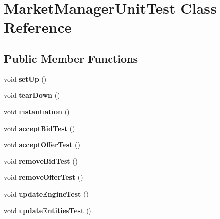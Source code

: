 \hypertarget{class_market_manager_unit_test}{\section{Market\+Manager\+Unit\+Test Class Reference}
\label{class_market_manager_unit_test}
}
\subsection*{Public Member Functions}
\begin{DoxyCompactItemize}
\item 
\hypertarget{class_market_manager_unit_test_a7675c43ec3a21669742870c5ff7bcdef}{void {\bfseries set\+Up} ()}\label{class_market_manager_unit_test_a7675c43ec3a21669742870c5ff7bcdef}

\item 
\hypertarget{class_market_manager_unit_test_a8ce1dfb5c96973d49b3b1308bc9b77b9}{void {\bfseries tear\+Down} ()}\label{class_market_manager_unit_test_a8ce1dfb5c96973d49b3b1308bc9b77b9}

\item 
\hypertarget{class_market_manager_unit_test_a975ffc40c27926b93d755a313440c35a}{void {\bfseries instantiation} ()}\label{class_market_manager_unit_test_a975ffc40c27926b93d755a313440c35a}

\item 
\hypertarget{class_market_manager_unit_test_aadbb351148ad8792ffdc73d21a477d46}{void {\bfseries accept\+Bid\+Test} ()}\label{class_market_manager_unit_test_aadbb351148ad8792ffdc73d21a477d46}

\item 
\hypertarget{class_market_manager_unit_test_a048bcd980b57e21cf535525c3d354327}{void {\bfseries accept\+Offer\+Test} ()}\label{class_market_manager_unit_test_a048bcd980b57e21cf535525c3d354327}

\item 
\hypertarget{class_market_manager_unit_test_ad15bca438fb420eb4edc10d2a6d5d69b}{void {\bfseries remove\+Bid\+Test} ()}\label{class_market_manager_unit_test_ad15bca438fb420eb4edc10d2a6d5d69b}

\item 
\hypertarget{class_market_manager_unit_test_a3a39f91093490fa570428eeadbee53d8}{void {\bfseries remove\+Offer\+Test} ()}\label{class_market_manager_unit_test_a3a39f91093490fa570428eeadbee53d8}

\item 
\hypertarget{class_market_manager_unit_test_a1c14446d8fae8ccdc8bbfb43054a5528}{void {\bfseries update\+Engine\+Test} ()}\label{class_market_manager_unit_test_a1c14446d8fae8ccdc8bbfb43054a5528}

\item 
\hypertarget{class_market_manager_unit_test_ac830f868e90ae29122ae6382a4d227de}{void {\bfseries update\+Entities\+Test} ()}\label{class_market_manager_unit_test_ac830f868e90ae29122ae6382a4d227de}

\end{DoxyCompactItemize}
